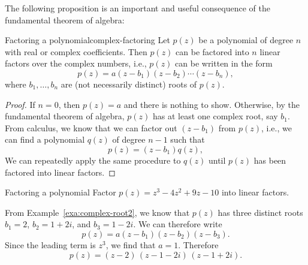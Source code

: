The following proposition is an important and useful consequence of
the fundamental theorem of algebra:

\begin{proposition}{Factoring a polynomial}{complex-factoring}
  Let $p(z)$ be a polynomial of degree $n$ with real or complex
  coefficients. Then $p(z)$ can be factored into $n$ linear factors
  over the complex numbers, i.e., $p(z)$ can be written in the form
  \begin{equation*}
    p(z) = a(z-b_1)(z-b_2)\cdots(z-b_n),
  \end{equation*}
  where $b_1,\ldots,b_n$ are (not necessarily distinct) roots of
  $p(z)$.
\end{proposition}

\begin{proof}
  If $n=0$, then $p(z)=a$ and there is nothing to show. Otherwise, by
  the fundamental theorem of algebra, $p(z)$ has at least one complex
  root, say $b_1$. From calculus, we know that we can factor out
  $(z-b_1)$ from $p(z)$, i.e., we can find a polynomial $q(z)$ of
  degree $n-1$ such that
  \begin{equation*}
    p(z) = (z-b_1) q(z),
  \end{equation*}
  We can repeatedly apply the same procedure to $q(z)$ until $p(z)$
  has been factored into linear factors.
\end{proof}

\begin{example}{Factoring a polynomial}
  Factor $p(z) = z^3 - 4z^2 + 9z - 10$ into linear factors.
\end{example}

\begin{solution}
  From Example~\ref{exa:complex-root2}, we know that $p(z)$ has three
  distinct roots $b_1=2$, $b_2=1+2i$, and $b_3=1-2i$. We can therefore
  write
  \begin{equation*}
    p(z) = a(z-b_1)(z-b_2)(z-b_3).
  \end{equation*}
  Since the leading term is $z^3$, we find that $a=1$. Therefore
  \begin{equation*}
    p(z) = (z-2)\,(z-1-2i)\,(z-1+2i).
  \end{equation*}
  \vspace{-2ex}
\end{solution}
